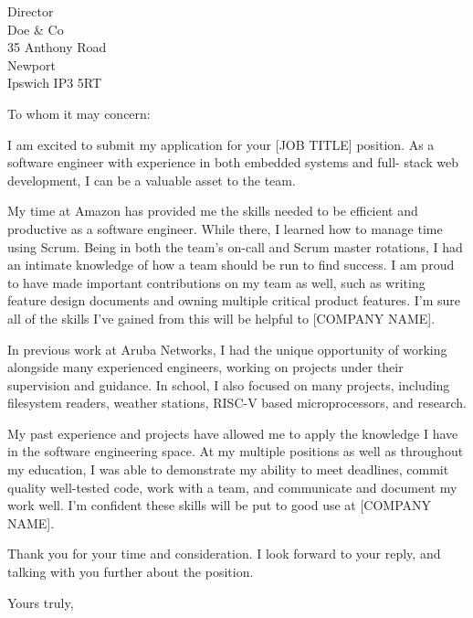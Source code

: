 \documentclass{letter}
\begin{document}
    \begin{letter}{Director \\ Doe \& Co \\ 35 Anthony Road
            \\ Newport \\ Ipswich IP3 5RT}
        \opening{To whom it may concern:}

        I am excited to submit my application for your [JOB TITLE] position. As 
        a software engineer with experience in both embedded systems and full-
        stack web development, I can be a valuable asset to the team.

        My time at Amazon has provided me the skills needed to be efficient and 
        productive as a software engineer. While there, I learned how to manage 
        time using Scrum. Being in both the team's on-call and Scrum master 
        rotations, I had an intimate knowledge of how a team should be run to 
        find success. I am proud to have made important contributions on my team 
        as well, such as writing feature design documents and owning multiple 
        critical product features. I'm sure all of the skills I've gained from 
        this will be helpful to [COMPANY NAME].
        
        In previous work at Aruba Networks, I had the unique opportunity of 
        working alongside many experienced engineers, working on projects under 
        their supervision and guidance. In school, I also focused on many 
        projects, including filesystem readers, weather stations, RISC-V based 
        microprocessors, and research.

        My past experience and projects have allowed me to apply the knowledge I
        have in the software engineering space. At my multiple positions as well 
        as throughout my education, I was able to demonstrate my ability to meet 
        deadlines, commit quality well-tested code, work with a team, and 
        communicate and document my work well. I'm confident these skills will 
        be put to good use at [COMPANY NAME].

        Thank you for your time and consideration. I look forward to your reply, 
        and talking with you further about the position.

        \closing{Yours truly,}

    \end{letter}
\end{document}
